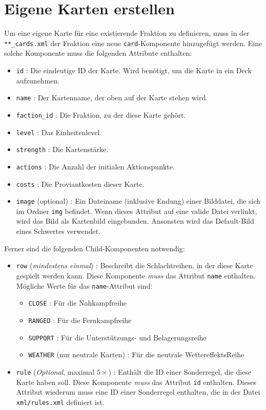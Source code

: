 \documentclass[a4paper,11pt]{report}
\begin{document}
\section{Eigene Karten erstellen}\label{C:newcard}
Um eine eigene Karte für eine existierende Fraktion zu definieren, muss in der \verb+**_cards.xml+ der Fraktion eine neue \verb+card+-Komponente hinzugefügt werden. Eine solche Komponente muss die folgenden Attribute enthalten:
\begin{itemize}
	\item \verb+id+ : Die eindeutige ID der Karte. Wird benötigt, um die Karte in ein Deck aufzunehmen.
	\item \verb+name+ : Der Kartenname, der oben auf der Karte stehen wird.
	\item \verb+faction_id+ : Die Fraktion, zu der diese Karte gehört.
	\item \verb+level+ : Das Einheitenlevel.
	\item \verb+strength+ : Die Kartenstärke.
	\item \verb+actions+ : Die Anzahl der initialen Aktionspunkte.
	\item \verb+costs+ : Die Proviantkosten dieser Karte.
	\item \verb+image+ (optional) : Ein Dateiname (inklusive Endung) einer Bilddatei, die sich im Ordner \verb+img+ befindet. Wenn dieses Attribut auf eine valide Datei verlinkt, wird das Bild als Kartenbild eingebunden. Ansonsten wird das Default-Bild eines Schwertes verwendet.
\end{itemize}

Ferner sind die folgenden Child-Komponenten notwendig:
\begin{itemize}
	\item \verb+row+ (\emph{mindestens einmal}) : Beschreibt die Schlachtreihen, in der diese Karte gespielt werden kann. Diese Komponente \emph{muss} das Attribut \verb+name+ enthalten. Mögliche Werte für das \verb+name+-Attribut sind:
	\begin{itemize}
		\item \verb+CLOSE+ : Für die Nahkampfreihe
		\item \verb+RANGED+ : Für die Fernkampfreihe
		\item \verb+SUPPORT+ : Für die Unterstützungs- und Belagerungsreihe
		\item \verb+WEATHER+ (nur neutrale Karten) : Für die neutrale WettereffektsReihe
	\end{itemize}
	\item \verb+rule+ (\emph{Optional}, maximal $5\times$) : Enthält die ID einer Sonderregel, die diese Karte haben soll. Diese Komponente \emph{muss} das Attribut \verb+id+ enthalten. Dieses Attribut wiederum muss eine ID einer Sonderregel enthalten, die in der Datei \verb+xml/rules.xml+ definiert ist.
\end{itemize}
\end{document}
